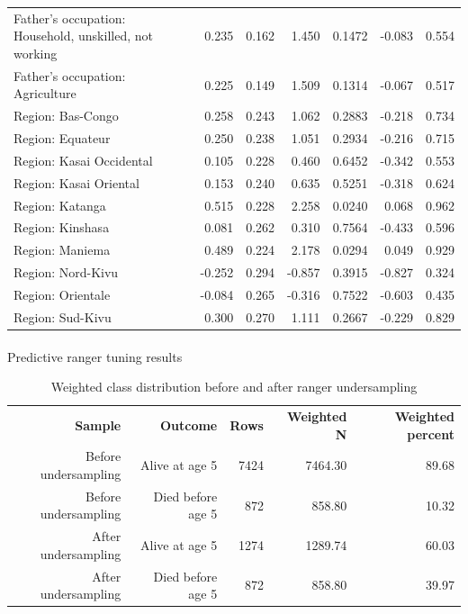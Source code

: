 \documentclass[
  11pt,
  a4paper,
]{article}
\makeatletter
\let\oldparagraph\paragraph
\renewcommand{\paragraph}{
    \@ifstar
      \xxxParagraphStar
      \xxxParagraphNoStar
  }
\newcommand{\xxxParagraphStar}[1]{\oldparagraph*{#1}\mbox{}}
\newcommand{\xxxParagraphNoStar}[1]{\oldparagraph{#1}\mbox{}}
\makeatother
\begin{document}
\begin{longtable}[t]{>{\raggedleft\arraybackslash}p{4.5cm}rrrrrr}
Father's occupation: Household, unskilled, not working & 0.235 & 0.162 & 1.450 & 0.1472 & -0.083 & 0.554\\
\addlinespace
Father's occupation: Agriculture & 0.225 & 0.149 & 1.509 & 0.1314 & -0.067 & 0.517\\
Region: Bas-Congo & 0.258 & 0.243 & 1.062 & 0.2883 & -0.218 & 0.734\\
Region: Equateur & 0.250 & 0.238 & 1.051 & 0.2934 & -0.216 & 0.715\\
Region: Kasai Occidental & 0.105 & 0.228 & 0.460 & 0.6452 & -0.342 & 0.553\\
Region: Kasai Oriental & 0.153 & 0.240 & 0.635 & 0.5251 & -0.318 & 0.624\\
\addlinespace
Region: Katanga & 0.515 & 0.228 & 2.258 & 0.0240 & 0.068 & 0.962\\
Region: Kinshasa & 0.081 & 0.262 & 0.310 & 0.7564 & -0.433 & 0.596\\
Region: Maniema & 0.489 & 0.224 & 2.178 & 0.0294 & 0.049 & 0.929\\
Region: Nord-Kivu & -0.252 & 0.294 & -0.857 & 0.3915 & -0.827 & 0.324\\
Region: Orientale & -0.084 & 0.265 & -0.316 & 0.7522 & -0.603 & 0.435\\
\addlinespace
Region: Sud-Kivu & 0.300 & 0.270 & 1.111 & 0.2667 & -0.229 & 0.829\\
\bottomrule

\end{longtable}

\endgroup{}

\paragraph{Predictive ranger tuning
results}\label{predictive-ranger-tuning-results}

\begingroup\fontsize{11}{13}\selectfont

\begin{longtable}[t]{rrrrr}

\caption{\label{tbl-appendix-ranger-sampling-summary}Weighted class
distribution before and after ranger undersampling}

\tabularnewline

\\
\toprule
\textbf{Sample} & \textbf{Outcome} & \textbf{Rows} & \textbf{Weighted N} & \textbf{Weighted percent}\\
\midrule
Before undersampling & Alive at age 5 & 7424 & 7464.30 & 89.68\\
Before undersampling & Died before age 5 & 872 & 858.80 & 10.32\\
After undersampling & Alive at age 5 & 1274 & 1289.74 & 60.03\\
After undersampling & Died before age 5 & 872 & 858.80 & 39.97\\
\bottomrule

\end{longtable}
\end{document}
